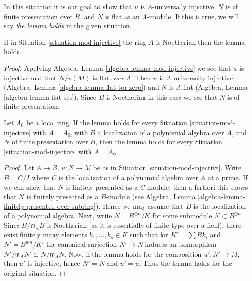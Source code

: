 \noindent
In this situation it is our goal to show that $u$ is $A$-universally injective,
$N$ is of finite presentation over $B$, and $N$ is flat as an $A$-module.
If this is true, we will say {\it the lemma holds} in the given situation.

\begin{lemma}
\label{lemma-Noetherian-finite-type-injective-into-flat-mod-m}
If in Situation \ref{situation-mod-injective} the ring $A$ is Noetherian
then the lemma holds.
\end{lemma}

\begin{proof}
Applying Algebra, Lemma \ref{algebra-lemma-mod-injective} we see that
$u$ is injective and that $N/u(M)$ is flat over $A$. Then $u$ is
$A$-universally injective
(Algebra, Lemma \ref{algebra-lemma-flat-tor-zero}) and $N$ is $A$-flat
(Algebra, Lemma \ref{algebra-lemma-flat-ses}). Since $B$ is Noetherian
in this case we see that $N$ is of finite presentation.
\end{proof}

\begin{lemma}
\label{lemma-reduce-finite-type-injective-into-flat-mod-m}
Let $A_0$ be a local ring. If the lemma holds for every
Situation \ref{situation-mod-injective} with $A = A_0$, with $B$ a
localization of a polynomial algebra over $A$, and $N$ of finite presentation
over $B$, then the lemma holds for every
Situation \ref{situation-mod-injective} with $A = A_0$.
\end{lemma}

\begin{proof}
Let $A \to B$, $u : N \to M$ be as in Situation \ref{situation-mod-injective}.
Write $B = C/I$ where $C$ is the localization of a polynomial algebra
over $A$ at a prime. If we can show that $N$ is finitely presented as
a $C$-module, then a fortiori this shows that $N$ is finitely presented
as a $B$-module (see
Algebra, Lemma \ref{algebra-lemma-finitely-presented-over-subring}).
Hence we may assume that $B$ is the localization of a polynomial algebra.
Next, write $N = B^{\oplus n}/K$ for some submodule $K \subset B^{\oplus n}$.
Since $B/\mathfrak m_AB$ is Noetherian (as it is essentially of finite type
over a field), there exist finitely many elements $k_1, \ldots, k_s \in K$
such that for $K' = \sum Bk_i$ and $N' = B^{\oplus n}/K'$ the
canonical surjection $N' \to N$ induces an isomorphism
$N'/\mathfrak m_AN' \cong N/\mathfrak m_AN$.
Now, if the lemma holds for the composition $u' : N' \to M$,
then $u'$ is injective, hence $N' = N$ and $u' = u$. Thus the lemma holds for
the original situation.
\end{proof}

